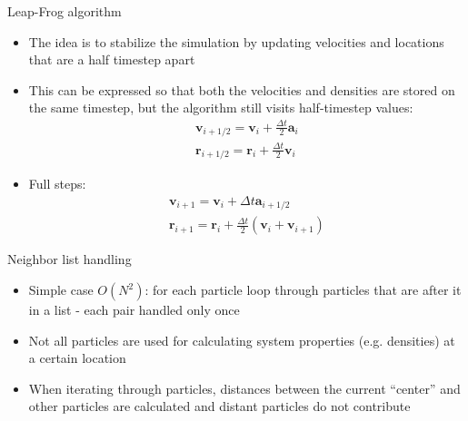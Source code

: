 \documentclass{beamer}
\begin{document}
\begin{frame}{Leap-Frog algorithm}
\begin{itemize}

\item The idea is to stabilize the simulation by updating
velocities and locations that are a half timestep apart
\item This can be expressed so that both the velocities and densities are stored on the same
timestep, but the algorithm still visits half-timestep values:
\begin{eqnarray}
 \mathbf{v}_{i+1/2} = \mathbf{v}_i + \frac{\Delta t}{2} \mathbf{a}_i \\
 \mathbf{r}_{i+1/2} = \mathbf{r}_i + \frac{\Delta t}{2} \mathbf{v}_i
\end{eqnarray}
\item Full steps:
\begin{eqnarray}
\mathbf{v}_{i+1} = \mathbf{v}_i + \Delta t \mathbf{a}_{i+1/2} \\
\mathbf{r}_{i+1} = \mathbf{r}_i + \frac{\Delta t}{2} ( \mathbf{v}_i + \mathbf{v}_{i+1} )
\end{eqnarray}

\end{itemize}
\end{frame}

\begin{frame}{Neighbor list handling}
\begin{itemize}

\item Simple case $O(N^2)$: for each particle loop through particles that are after it in a list -
each pair handled only once
\item Not all particles are used for calculating system properties (e.g. densities) at a certain location
\item When iterating through particles, distances between the current ``center'' and other particles are calculated and distant particles do not contribute

\end{itemize}
\end{frame}
\end{document}
